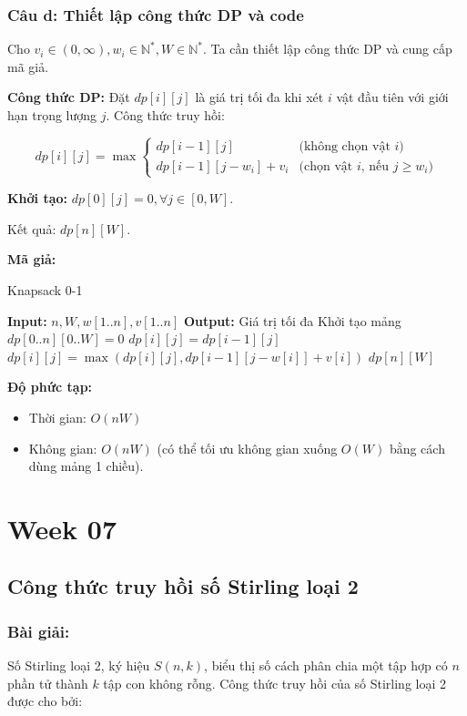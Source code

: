 \documentclass[a4paper,12pt]{article}
\begin{document}
\subsubsection*{Câu d: Thiết lập công thức DP và code}
Cho \( v_i \in (0, \infty), w_i \in \mathbb{N}^*, W \in \mathbb{N}^* \). Ta cần thiết lập công thức DP và cung cấp mã giả.

\textbf{Công thức DP:}
Đặt \( dp[i][j] \) là giá trị tối đa khi xét \( i \) vật đầu tiên với giới hạn trọng lượng \( j \). Công thức truy hồi:

\[
dp[i][j] = \max \begin{cases} 
dp[i-1][j] & \text{(không chọn vật } i\text{)} \\ 
dp[i-1][j-w_i] + v_i & \text{(chọn vật } i\text{, nếu } j \geq w_i\text{)}
\end{cases}
\]

\textbf{Khởi tạo:} \( dp[0][j] = 0, \forall j \in [0, W] \).

Kết quả: \( dp[n][W] \).

\textbf{Mã giả:}
\begin{algorithm}
\caption{Knapsack 0-1}
\begin{algorithmic}[1]
\State \textbf{Input:} \( n, W, w[1..n], v[1..n] \)
\State \textbf{Output:} Giá trị tối đa
\State Khởi tạo mảng \( dp[0..n][0..W] = 0 \)
        \State \( dp[i][j] = dp[i-1][j] \)
            \State \( dp[i][j] = \max(dp[i][j], dp[i-1][j-w[i]] + v[i]) \)
        \EndIf
    \EndFor
\EndFor
\State \Return \( dp[n][W] \)
\end{algorithmic}
\end{algorithm}

\textbf{Độ phức tạp:} 
\begin{itemize}
    \item Thời gian: \( O(nW) \)
    \item Không gian: \( O(nW) \) (có thể tối ưu không gian xuống \( O(W) \) bằng cách dùng mảng 1 chiều).
\end{itemize}

\section*{Week 07}
\subsection*{Công thức truy hồi số Stirling loại 2}
\subsubsection*{Bài giải:}
Số Stirling loại 2, ký hiệu \( S(n, k) \), biểu thị số cách phân chia một tập hợp có \( n \) phần tử thành \( k \) tập con không rỗng. Công thức truy hồi của số Stirling loại 2 được cho bởi:
\end{document}
